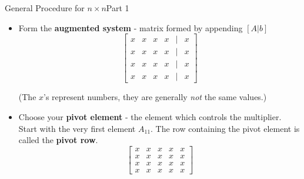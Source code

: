 \documentclass[10pt]{beamer}
\begin{document}
\begin{frame}{General Procedure for $n\times n$}{Part 1}

\begin{itemize}
    \item[1.] Form the \textbf{augmented system} - matrix formed by appending $[A|b]$
    \[
    \begin{bmatrix}
        x & x & x & x & \big| & x \\
        x & x & x & x & \big| & x \\
        x & x & x & x & \big| & x \\
        x & x & x & x & \big| & x
    \end{bmatrix}
    \]

(The $x$'s represent numbers, they are generally \emph{not} the same
values.)\\
\vspace{0.5cm}
\item[2.] Choose your \textbf{pivot element} - the element which controls the multiplier. Start with the very first element $A_{11}$. The row containing the pivot element is called the \textbf{pivot row}.
    \[
    \begin{bmatrix}
        \boxed{x} & x & x & x  & x \\
        x & x & x & x &  x \\
        x & x & x & x &  x \\
        x & x & x & x &  x
    \end{bmatrix}
    \]

\end{itemize}
\end{frame}
\end{document}
